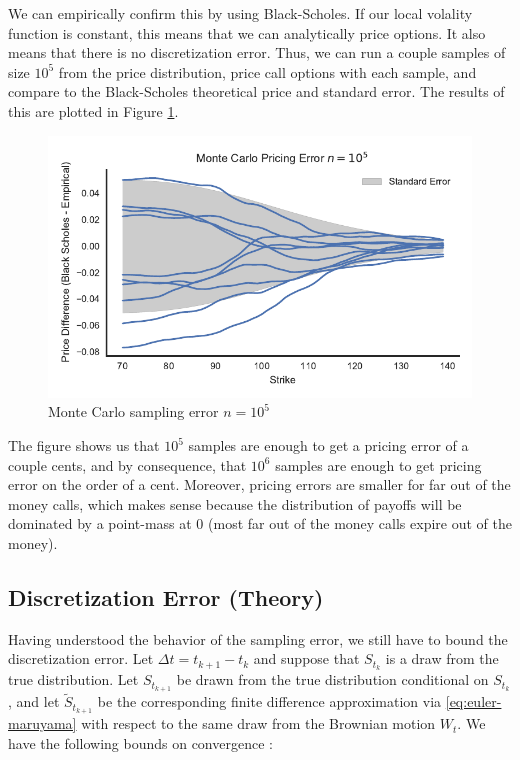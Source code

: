 \documentclass[11pt]{article}
\numberwithin{equation}{section}
\begin{document}
We can empirically confirm this by using Black-Scholes. If our local volality
function is constant, this means that we can analytically price options. It also
means that there is no discretization error. Thus, we can run a couple samples
of size $10^5$ from the price distribution, price call options with each sample,
and compare to the Black-Scholes theoretical price and standard error. The
results of this are plotted in Figure \ref{fig:mcsamplingerror}.


\begin{figure}[h]
\centering
\includegraphics{figs/mcsamplingerror}
\caption{Monte Carlo sampling error $n=10^5$}
\label{fig:mcsamplingerror}
\end{figure}

The figure shows us that $10^5$ samples are enough to get a pricing error of a
couple cents, and by consequence, that $10^6$ samples are enough to get pricing
error on the order of a cent. Moreover, pricing errors are smaller for far out
of the money calls, which makes sense because the distribution of payoffs will
be dominated by a point-mass at 0 (most far out of the money calls expire out of
the money).

\subsection{Discretization Error (Theory)}

Having understood the behavior of the sampling error, we still have to bound the
discretization error. Let $\Delta t = t_{k+1} - t_k$
and suppose that $S_{t_k}$ is a draw from the true distribution. Let
$S_{t_{k+1}}$ be drawn from the true distribution conditional on $S_{t_k}$, and
let $\tilde S_{t_{k+1}}$ be the corresponding finite difference approximation
via \eqref{eq:euler-maruyama} with respect to the same draw from the Brownian
motion $W_t$. We have the following bounds on convergence
\citep{higham2001algorithmic}:
\end{document}
